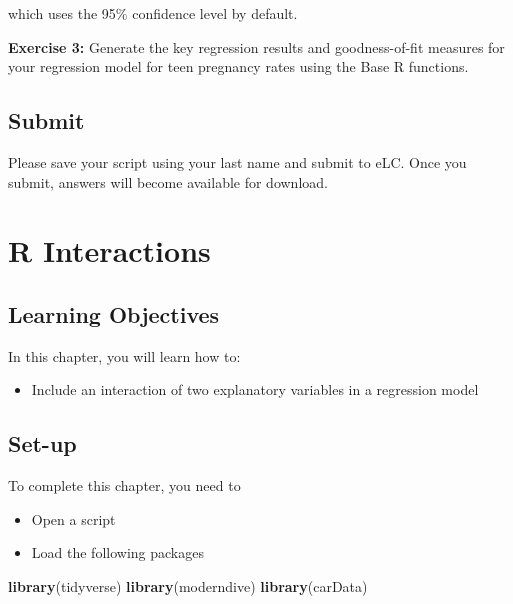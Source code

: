 \documentclass[
]{book}
\newenvironment{Shaded}{\begin{snugshade}}{\end{snugshade}}
\newcommand{\KeywordTok}[1]{\textcolor[rgb]{0.13,0.29,0.53}{\textbf{#1}}}
\newcommand{\NormalTok}[1]{#1}
\providecommand{\tightlist}{%
  \setlength{\itemsep}{0pt}\setlength{\parskip}{0pt}}
\newenvironment{learncheck}%
{%
  \par\vspace{\baselineskip}\noindent 
  \color{Exercise}\begin{itshape}%
  \par\vspace{\baselineskip}\noindent\ignorespaces 
}%
{%
  \end{itshape}\ignorespacesafterend 
}
\begin{document}
which uses the 95\% confidence level by default.

\begin{learncheck}
\textbf{Exercise 3:} Generate the key regression results and
goodness-of-fit measures for your regression model for teen pregnancy
rates using the Base R functions.
\end{learncheck}

\hypertarget{submit}{%
\section{Submit}\label{submit}}

Please save your script using your last name and submit to eLC. Once you submit, answers will become available for download.

\hypertarget{r-interactions}{%
\chapter{R Interactions}\label{r-interactions}}

\hypertarget{learning-objectives}{%
\section{Learning Objectives}\label{learning-objectives}}

In this chapter, you will learn how to:

\begin{itemize}
\tightlist
\item
  Include an interaction of two explanatory variables in a regression model
\end{itemize}

\hypertarget{set-up}{%
\section{Set-up}\label{set-up}}

To complete this chapter, you need to

\begin{itemize}
\tightlist
\item
  Open a script
\item
  Load the following packages
\end{itemize}

\begin{Shaded}
\begin{Highlighting}[]
\KeywordTok{library}\NormalTok{(tidyverse)}
\KeywordTok{library}\NormalTok{(moderndive)}
\KeywordTok{library}\NormalTok{(carData)}
\end{Highlighting}
\end{Shaded}
\end{document}
